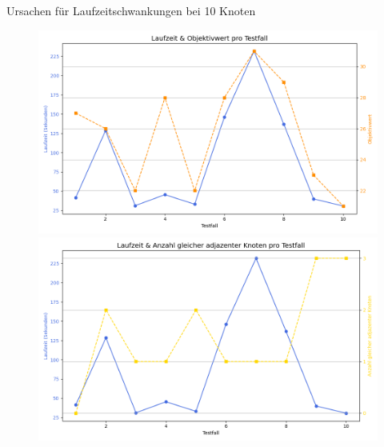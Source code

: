 \documentclass[9pt]{beamer}
\begin{document}
    \begin{frame}{Ursachen für Laufzeitschwankungen bei 10 Knoten}
        \begin{figure}
        \centering
        \begin{minipage}{0.48\textwidth}
            \centering
            \includegraphics[width=\linewidth]{figures/LaufzeitObjektivwert10.png}
        \end{minipage}\hfill
        \begin{minipage}{0.48\textwidth}
            \centering
            \includegraphics[width=\linewidth]{figures/LaufzeitAdjNodes10.png}
        \end{minipage}
    \end{figure}
    \end{frame}
\end{document}
